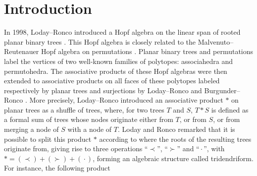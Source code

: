 \documentclass[11pt]{article}
\theoremstyle{definition}
\numberwithin{equation}{section}
\numberwithin{equation}{section}
\newcommand{\bcdot}{\,{\bm \cdot}\,}
\begin{document}
 \section{Introduction} \label{Intro-section}
In 1998, Loday--Ronco introduced a Hopf algebra on the linear 
span of rooted planar binary trees \cite{LR-planar-Hopf}. 
This Hopf algebra is closely related to the Malvenuto--
Reutenauer Hopf algebra on permutations \cite{MalvReut}. 
Planar binary trees and permutations label the vertices of 
two well-known families of  polytopes: associahedra and 
permutohedra. The associative products of these Hopf algebras 
were then extended to associative products on all faces of 
these polytopes labeled respectively by planar trees and 
surjections by Loday--Ronco \cite{LR02} and Burgunder--Ronco 
\cite{BR}. 
More precisely, Loday--Ronco introduced an associative product 
$\ast$ on planar trees as a shuffle of trees, where, for two trees $T$ and $S$,  
 $T \ast S$ is defined as a 
formal sum of trees whose nodes originate either from $T$, or 
from $S$, or from merging a node of $S$ with a node of $T$. 
Loday and Ronco remarked that it is possible to split this 
product $\ast$  according to where the roots of the resulting trees originate from, giving rise to three operations ``$\prec$'', ``$\succ$'' and ``$\bcdot$'', with $\ast=(\prec) + (\succ) +  (\bcdot)$, forming an algebraic structure called tridendriform. 
For instance, the following product
\end{document}
